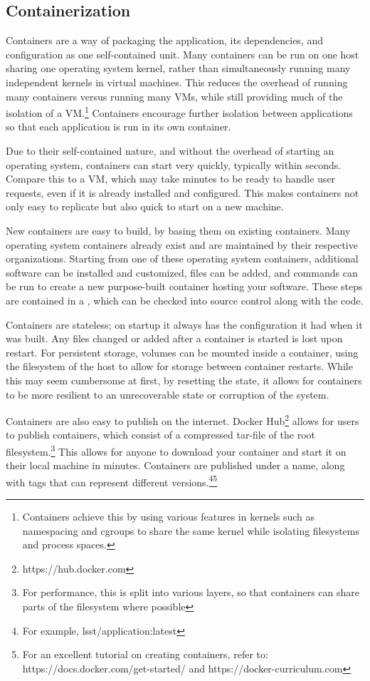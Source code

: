 \documentclass[11pt,twoside]{article}
\begin{document}
\subsection{Containerization}

Containers are a way of packaging
the application, its dependencies, and configuration as one self-contained unit.  Many containers can be
run on one host sharing one operating system kernel, rather than simultaneously
running many independent kernels in virtual machines.  This reduces the overhead of running many containers
versus running many VMs, while still providing much of the isolation of a VM.\footnote{Containers
achieve this by using various features in kernels such as namespacing and cgroups
to share the same kernel while isolating filesystems and process spaces.}  Containers
encourage further isolation between applications so that each application is run in its
own container.

Due to their self-contained nature, and without the overhead of
starting an operating system, containers can start very quickly, typically within seconds.
Compare this to a VM, which may take minutes to be ready to handle user requests, even if
it is already installed and configured. This makes containers not only easy to replicate but
also quick to start on a new machine.

New containers are easy to build, by basing them on existing containers.  Many operating
system containers already exist and are maintained by their respective organizations.
Starting from one of these operating system containers, additional software can be
installed and customized, files can be added, and commands can be run to create a
new purpose-built container hosting your software.  These steps are contained in a
, which can be checked into source control along with the code.

Containers are stateless; on startup it always
has the configuration it had when it was built.  Any files changed or added
after a container is started is lost upon restart.  For persistent storage,
volumes can be mounted inside a container, using the filesystem of the host
to allow for storage between container restarts.  While this may seem cumbersome
at first, by resetting the state, it allows for containers to be more resilient
to an unrecoverable state or corruption of the system.

Containers are also easy to publish on the internet.  Docker Hub\footnote{https://hub.docker.com}
allows for users to publish containers, which consist of
a compressed tar-file of the root filesystem.\footnote{For performance, this is split into
various layers, so that containers can share parts of the filesystem where possible} This allows for
anyone to download your container and start it on their local machine in minutes.  Containers are published under
a name, along with tags that can represent different versions.\footnote{For example, lsst/application:latest}\footnote{
For an excellent tutorial on creating containers, refer to: https://docs.docker.com/get-started/
and https://docker-curriculum.com}
\end{document}
